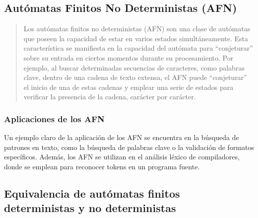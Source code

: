\documentclass{article}
\begin{document}
    \subsection{Autómatas Finitos No Deterministas (AFN)}
        \begin{quote}
            Los autómatas finitos no deterministas (AFN) son una clase de autómatas que poseen la capacidad de estar en varios estados
            simultáneamente. Esta característica se manifiesta en la capacidad del autómata para ``conjeturar'' sobre su entrada en ciertos
            momentos durante su procesamiento. Por ejemplo, al buscar determinadas secuencias de caracteres, como palabras clave, dentro de
            una cadena de texto extensa, el AFN puede ``conjeturar'' el inicio de una de estas cadenas y emplear una serie de estados para
            verificar la presencia de la cadena, carácter por carácter.\cite{hopcroft2007introduccion}
        \end{quote}
        \subsubsection{Aplicaciones de los AFN}
            Un ejemplo claro de la aplicación de los AFN se encuentra en la búsqueda de patrones en texto, como la búsqueda de palabras clave
            o la validación de formatos específicos. Además, los AFN se utilizan en el análisis léxico de compiladores, donde se emplean para
            reconocer tokens en un programa fuente.

    \subsection{Equivalencia de autómatas finitos deterministas y no deterministas}
\end{document}
